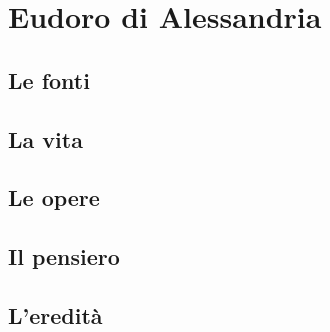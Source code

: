 \chapter{Eudoro di Alessandria}

\section{Le fonti}

\section{La vita}

\section{Le opere}

\section{Il pensiero}

\section{L'eredità}
